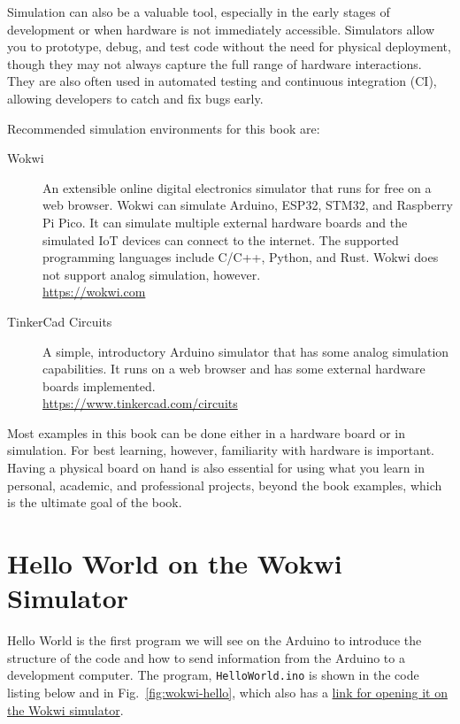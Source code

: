 Simulation can also be a valuable tool, especially in the early stages of development or when hardware is not immediately accessible.
Simulators allow you to prototype, debug, and test code without the need for physical deployment, though they may not always capture the full range of hardware interactions.
They are also often used in automated testing and continuous integration (CI), allowing developers to catch and fix bugs early.

Recommended simulation environments for this book are:
\begin{description}
\item[Wokwi] 
  An extensible online digital electronics simulator that runs for free on a web browser.
  Wokwi can simulate Arduino, ESP32, STM32, and Raspberry Pi Pico.
  It can simulate multiple external hardware boards and the simulated IoT devices can connect to the internet.
  The supported programming languages include C/C++, Python, and Rust.
  Wokwi does not support analog simulation, however.\\
  \url{https://wokwi.com}
\item[TinkerCad Circuits] 
  A simple, introductory Arduino simulator that has some analog simulation capabilities.
  It runs on a web browser and has some external hardware boards implemented.\\
  \url{https://www.tinkercad.com/circuits}
\end{description}

Most examples in this book can be done either in a hardware board or in simulation.
For best learning, however, familiarity with hardware is important.
Having a physical board on hand is also essential for using what you learn in personal, academic, and professional projects, beyond the book examples, which is the ultimate goal of the book.

\section{Hello World on the Wokwi Simulator}

Hello World is the first program we will see on the Arduino to introduce the structure of the code and how to send information from the Arduino to a development computer.
The program, \texttt{HelloWorld.ino} is shown in the code listing below and in Fig.~\ref{fig:wokwi-hello}, which also has a \href{https://wokwi.com/projects/420387835399008257}{link for opening it on the Wokwi simulator}.


